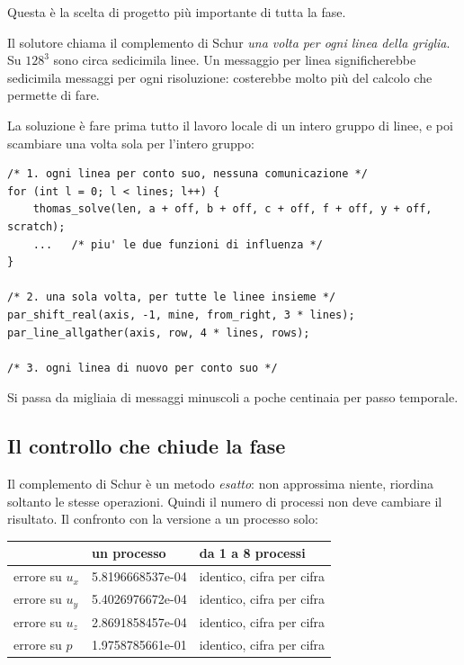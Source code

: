 \documentclass[11pt,a4paper]{article}
\begin{document}
Questa è la scelta di progetto più importante di tutta la fase.

Il solutore chiama il complemento di Schur \emph{una volta per ogni linea della
griglia}. Su $128^3$ sono circa sedicimila linee. Un messaggio per linea
significherebbe sedicimila messaggi per ogni risoluzione: costerebbe molto più
del calcolo che permette di fare.

La soluzione è fare prima tutto il lavoro locale di un intero gruppo di linee,
e poi scambiare una volta sola per l'intero gruppo:

\begin{lstlisting}
/* 1. ogni linea per conto suo, nessuna comunicazione */
for (int l = 0; l < lines; l++) {
    thomas_solve(len, a + off, b + off, c + off, f + off, y + off, scratch);
    ...   /* piu' le due funzioni di influenza */
}

/* 2. una sola volta, per tutte le linee insieme */
par_shift_real(axis, -1, mine, from_right, 3 * lines);
par_line_allgather(axis, row, 4 * lines, rows);

/* 3. ogni linea di nuovo per conto suo */
\end{lstlisting}

Si passa da migliaia di messaggi minuscoli a poche centinaia per passo
temporale.

\subsection*{Il controllo che chiude la fase}

Il complemento di Schur è un metodo \emph{esatto}: non approssima niente,
riordina soltanto le stesse operazioni. Quindi il numero di processi non deve
cambiare il risultato. Il confronto con la versione a un processo solo:

\begin{center}
\begin{tabular}{@{}lll@{}}
\toprule
& \textbf{un processo} & \textbf{da 1 a 8 processi} \\
\midrule
errore su $u_x$ & 5.8196668537e-04 & identico, cifra per cifra \\
errore su $u_y$ & 5.4026976672e-04 & identico, cifra per cifra \\
errore su $u_z$ & 2.8691858457e-04 & identico, cifra per cifra \\
errore su $p$   & 1.9758785661e-01 & identico, cifra per cifra \\
\bottomrule
\end{tabular}
\end{center}
\end{document}
